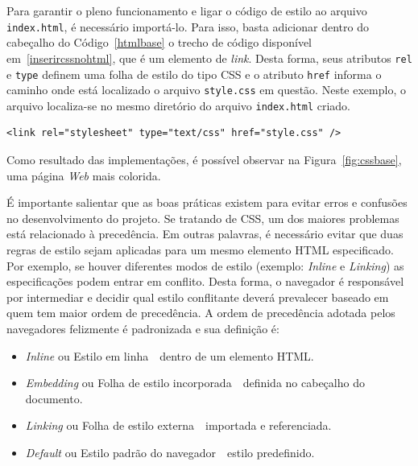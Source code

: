 Para garantir o pleno funcionamento e ligar o código de estilo ao arquivo \texttt{index.html}, é necessário importá-lo. Para isso, basta adicionar dentro do cabeçalho do Código~\ref{htmlbase} o trecho de código disponível em~\ref{inserircssnohtml}, que é um elemento de \textit{link}. Desta forma, seus atributos \texttt{rel} e \texttt{type} definem uma folha de estilo do tipo CSS e o atributo \texttt{href} informa o caminho onde está localizado o arquivo \texttt{style.css} em questão. Neste exemplo, o arquivo localiza-se no mesmo diretório do arquivo \texttt{index.html} criado.
\begin{lstlisting}[label=inserircssnohtml,caption=Inserir CSS externo no HTML.]
<link rel="stylesheet" type="text/css" href="style.css" />
\end{lstlisting}

Como resultado das implementações, é possível observar na Figura~\ref{fig:cssbase}, uma página \textit{Web} mais colorida.

\begin{figure}[th]
\end{figure}

É importante salientar que as boas práticas existem para evitar erros e confusões no desenvolvimento do projeto. Se tratando de CSS, um dos maiores problemas está relacionado à precedência. Em outras palavras, é necessário evitar que duas regras de estilo sejam aplicadas para um mesmo elemento HTML especificado. Por exemplo, se houver diferentes modos de estilo (exemplo: \textit{Inline} e \textit{Linking}) as especificações podem entrar em conflito. Desta forma, o navegador é responsável por intermediar e decidir qual estilo conflitante deverá prevalecer baseado em quem tem maior ordem de precedência. A ordem de precedência adotada pelos navegadores felizmente é padronizada e sua definição é:
\begin{itemize}
    \item \textit{Inline} ou Estilo em linha~\textemdash~dentro de um elemento HTML.
    \item \textit{Embedding} ou Folha de estilo incorporada~\textemdash~definida no cabeçalho do documento.
    \item \textit{Linking} ou Folha de estilo externa~\textemdash~importada e referenciada.
    \item \textit{Default} ou Estilo padrão do navegador~\textemdash~estilo predefinido.
\end{itemize}

